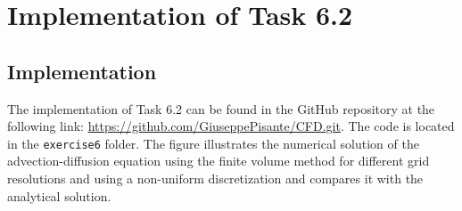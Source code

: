 \documentclass{article}
\begin{document}
\section{Implementation of Task 6.2}

\subsection{Implementation}
The implementation of Task 6.2 can be found in the GitHub repository at the following link: \url{https://github.com/GiuseppePisante/CFD.git}. 
The code is located in the \texttt{exercise6} folder. The figure illustrates the numerical solution of the advection-diffusion equation using 
the finite volume method for different grid resolutions and using a non-uniform discretization and compares it with the analytical solution. 
\end{document}
